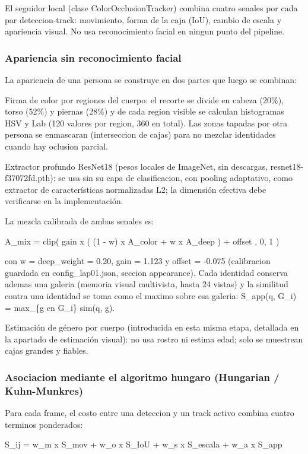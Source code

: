 \documentclass[12pt,letterpaper]{article}
\begin{document}
El seguidor local (clase ColorOcclusionTracker) combina cuatro senales por cada par deteccion-track: movimiento, forma de la caja (IoU), cambio de escala y apariencia visual. No usa reconocimiento facial en ningun punto del pipeline.


\subsubsection{Apariencia sin reconocimiento facial}

La apariencia de una persona se construye en dos partes que luego se combinan:


Firma de color por regiones del cuerpo: el recorte se divide en cabeza (20\%), torso (52\%) y piernas (28\%) y de cada region visible se calculan histogramas HSV y Lab (120 valores por region, 360 en total). Las zonas tapadas por otra persona se enmascaran (interseccion de cajas) para no mezclar identidades cuando hay oclusion parcial.


Extractor profundo ResNet18 (pesos locales de ImageNet, sin descargas, resnet18-f37072fd.pth): se usa sin su capa de clasificacion, con pooling adaptativo, como extractor de características normalizadas L2; la dimensión efectiva debe verificarse en la implementación.


La mezcla calibrada de ambas senales es:


A\_mix = clip( gain  x  ( (1 - w)  x  A\_color + w  x  A\_deep ) + offset , 0, 1 )


con w = deep\_weight = 0.20, gain = 1.123 y offset = -0.075 (calibracion guardada en config\_lap01.json, seccion appearance). Cada identidad conserva ademas una galeria (memoria visual multivista, hasta 24 vistas) y la similitud contra una identidad se toma como el maximo sobre esa galeria: S\_app(q, G\_i) = max\_\{g en G\_i\} sim(q, g).


Estimación de género por cuerpo (introducida en esta misma etapa, detallada en la apartado de estimación visual): no usa rostro ni estima edad; solo se muestrean cajas grandes y fiables.


\subsubsection{Asociacion mediante el algoritmo hungaro (Hungarian / Kuhn-Munkres)}

Para cada frame, el costo entre una deteccion y un track activo combina cuatro terminos ponderados:


S\_ij = w\_m  x  S\_mov + w\_o  x  S\_IoU + w\_s  x  S\_escala + w\_a  x  S\_app
\end{document}
